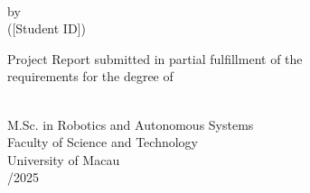 %
\begin{titlepage}
    \begin{center}
        \vspace*{2.8cm}

        {\fontsize{12}{15}\selectfont
        \parbox{0.84\textwidth}{}}\\[0.9cm]

        {\fontsize{12}{15}\selectfont by}\\[0.7cm]

        {\fontsize{12}{15} ([Student ID])}\\[4.0cm]

        {\fontsize{12}{15}\selectfont
        \parbox{0.64\textwidth}{\centering
        Project Report submitted in partial fulfillment of the\\[-0.4cm]
        requirements for the degree of}}\\[3.2cm]

        {\fontsize{12}{15}\selectfont M.Sc. in Robotics and Autonomous Systems}\\[4.0cm]

        {\fontsize{12}{15}\selectfont Faculty of Science and Technology\\[-0.4cm]
        University of Macau}\\[1.0cm]

        {\fontsize{12}{15}/2025}
    \end{center}
\end{titlepage}
